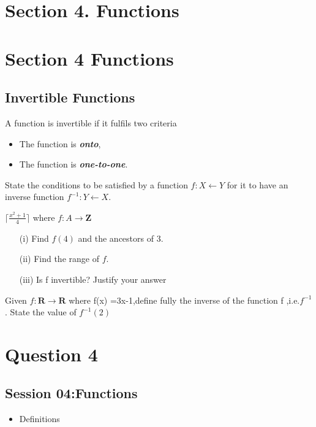 \documentclass[]{report}
\begin{document}
\begin{enumerate}
\newpage

\section*{Section 4. Functions}





\section{Section 4 Functions}

\subsection{Invertible Functions}
A function is invertible if it fulfils two criteria
\begin{itemize}
\item The function is \textbf{\textit{onto}},
\item The function is \textbf{\textit{one-to-one}}.
\end{itemize}

State the conditions to be satisfied by a function
$f : X \leftarrow Y$ for it to have an inverse function
$f^{-1} : Y \leftarrow X$.

$\lceil \frac{x^2+1}{4} \rceil$
where $f : A \rightarrow \textbf{Z}$
\begin{itemize}
\item[(i)] Find $f(4)$ and the ancestors of 3.
\item[(ii)] Find the range of $f$.
\item[(iii)] Is f invertible? Justify your answer
\end{itemize}

Given $f : \textbf{R} \rightarrow \textbf{R}$ where f(x) =3x-1,define fully
the inverse of the function f ,i.e.$f^{-1}$. 
State the value of $f^{-1}(2)$
\section*{Question 4}



\subsection*{Session 04:Functions}
\begin{itemize}
\item Definitions
\end{itemize}


\end{enumerate}
\end{document}
